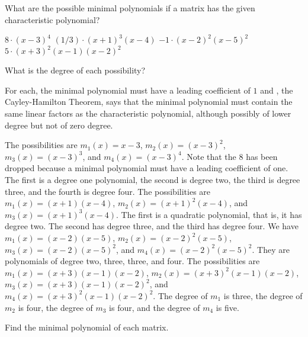 \begin{exercises}
  \recommended \item 
    What are the possible minimal polynomials if a matrix has
    the given characteristic polynomial?
    \begin{exparts*}
      \partsitem $8\cdot (x-3)^4$
      \partsitem $(1/3)\cdot (x+1)^3(x-4)$
      \partsitem $-1\cdot (x-2)^2(x-5)^2$
      \partsitem  \( 5\cdot(x+3)^2(x-1)(x-2)^2 \)
    \end{exparts*}
    What is the degree of each possibility?
    \begin{answer}
      For each, 
      the minimal polynomial must have a leading coefficient of $1$
      and , the Cayley-Hamilton Theorem, says that
      the minimal polynomial must contain the same linear factors
      as the characteristic polynomial, although possibly of lower degree
      but not of zero degree.
      \begin{exparts}
        \partsitem The possibilities are 
          $m_1(x)=x-3$, $m_2(x)=(x-3)^2$, $m_3(x)=(x-3)^3$,
          and $m_4(x)=(x-3)^4$.
          Note that the $8$ has been dropped because a minimal
          polynomial must have a leading coefficient of one.
          The first is a degree one polynomial, the second is degree two,
          the third is degree three, and the fourth is degree four.
        \partsitem The possibilities are $m_1(x)=(x+1)(x-4)$,
          $m_2(x)=(x+1)^2(x-4)$, and $m_3(x)=(x+1)^3(x-4)$.
          The first is a quadratic polynomial, that is, it has degree two.
          The second has degree three, and the third has degree four.
        \partsitem We have $m_1(x)=(x-2)(x-5)$, $m_2(x)=(x-2)^2(x-5)$,
          $m_3(x)=(x-2)(x-5)^2$, and $m_4(x)=(x-2)^2(x-5)^2$.
          They are polynomials of degree two, three, three, and four.
        \partsitem The possibilities are \( m_1(x)=(x+3)(x-1)(x-2) \),
          \( m_2(x)=(x+3)^2(x-1)(x-2) \),
          \( m_3(x)=(x+3)(x-1)(x-2)^2 \),
          and \( m_4(x)=(x+3)^2(x-1)(x-2)^2 \).
          The degree of $m_1$ is three, the degree of $m_2$ is four,
          the degree of $m_3$ is four, and the degree of $m_4$ is five.
      \end{exparts}
    \end{answer}
  \recommended \item 
    Find the minimal polynomial of each matrix.
\end{exercises}
